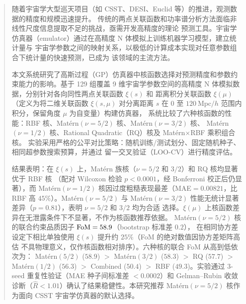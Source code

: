 \begin{abstract}
  随着宇宙学大型巡天项目（如 CSST、DESI、Euclid 等）的推进，观测数据的精度和规模迅速提升。
  传统的两点关联函数和功率谱分析方法面临非线性尺度信息提取不足的挑战，亟需开发高精度的理论
  预测工具。宇宙学仿真器（emulator）通过在高精度 N 体模拟上训练机器学习模型，建立统计量与
  宇宙学参数之间的映射关系，以极低的计算成本实现对任意参数组合下统计量的快速预测，已成为
  该领域的主流方法。

  本文系统研究了高斯过程（GP）仿真器中核函数选择对预测精度和参数约束能力的影响。基于 129
  组覆盖 9 维宇宙学参数空间的高精度 N 体模拟数据，分别针对各向同性两点关联函数 $\xi(s)$ 和
  距离积分关联函数 $\xi(\mu)$（定义为将二维关联函数 $\xi(s,\mu)$ 对分离距离 $s$
  在 $0$ 至 $120~\mathrm{Mpc}/h$ 范围内积分，保留角度 $\mu$ 为自变量）构建仿真器，
  系统比较了六种核函数的性能：RBF 核、Mat\'ern$(\nu=5/2)$ 核、Mat\'ern$(\nu=3/2)$ 核、
  Mat\'ern$(\nu=1/2)$ 核、Rational Quadratic（RQ）核及 Mat\'ern$\times$RBF 乘积组合核。
  实验采用严格的公平对比策略：随机训练/测试划分、固定随机种子、相同超参数搜索预算，并通过
  留一交叉验证（LOO-CV）进行精度评估。

  结果表明：在 $\xi(s)$ 上，Mat\'ern 族核（$\nu=5/2$ 和 $3/2$）和 RQ 核均显著优于 RBF 核
  （配对 Wilcoxon 检验 $p<0.0001$，经 Bonferroni 校正后仍显著），而 Mat\'ern$(\nu=1/2)$
  核因过度粗糙表现最差（MAE${}=0.00821$，比 RBF 高 $45\%$）。Mat\'ern$(\nu=5/2)$ 与
  Mat\'ern$(\nu=3/2)$ 性能无统计显著差异（$p=0.81$），表明 $\nu=5/2$ 和 $3/2$ 均为合适
  选择。$\xi(\mu)$ 上核函数差异在无泄露条件下不显著，不作为核函数推荐依据。
  Mat\'ern$(\nu=5/2)$ 核的联合约束品质因子 ${\rm FoM}=58.9$（bootstrap 标准差 $0.2$），
  在相同协方差设定下相比单独使用 $\xi(s)$ 提升约 $25\%$（FoM 的绝对数值因协方差矩阵高估
  不具物理意义，仅作核函数相对排序）。六种核的联合 FoM 从高到低依次为：
  Mat\'ern$(5/2)$ ($58.9$) ${}>{}$ Mat\'ern$(3/2)$
  ($58.3$) ${}>{}$ RQ ($57.7$) ${}>{}$ Mat\'ern$(1/2)$ ($56.3$) ${}>{}$ Combined
  ($50.4$) ${}>{}$ RBF ($49.3$)。实验通过 3-seed 重复性验证（MAE 种子间标准差
  ${<}0.0002$）和 Gelman--Rubin 收敛诊断（$\hat R<1.01$）确认了结果稳健性。本研究推荐
  Mat\'ern$(\nu=5/2)$ 核作为面向 CSST 宇宙学仿真器的默认选择。
\end{abstract}

